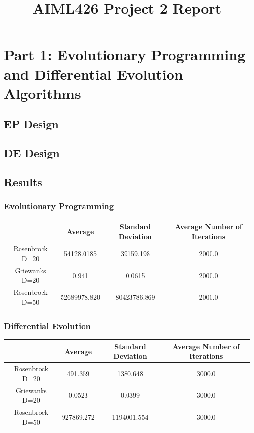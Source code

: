 \documentclass{article}
\title{AIML426 Project 2 Report}
\date{}
\begin{document}
	\maketitle
	
\section*{Part 1: Evolutionary Programming and Differential Evolution Algorithms}
\subsection*{EP Design}
\subsection*{DE Design}
\subsection*{Results}
\subsubsection*{Evolutionary Programming}
\begin{center}
	\begin{tabular}{|c|c|c|c|}
		\hline
		& Average & Standard Deviation & Average Number of Iterations \\
		\hline
		Rosenbrock D=20 & 54128.0185 & 39159.198 & 2000.0 \\
		\hline
		Griewanks D=20 & 0.941 & 0.0615 & 2000.0 \\
		\hline
		Rosenbrock D=50 & 52689978.820 & 80423786.869 & 2000.0 \\
		\hline
	\end{tabular}
\end{center}

\subsubsection*{Differential Evolution}
\begin{center}
	\begin{tabular}{|c|c|c|c|}
		\hline
		& Average & Standard Deviation & Average Number of Iterations \\
		\hline
		Rosenbrock D=20 & 491.359 & 1380.648 & 3000.0 \\
		\hline
		Griewanks D=20 & 0.0523 & 0.0399 & 3000.0 \\
		\hline
		Rosenbrock D=50 & 927869.272 & 1194001.554 & 3000.0 \\
		\hline
	\end{tabular}
\end{center}
\end{document}
